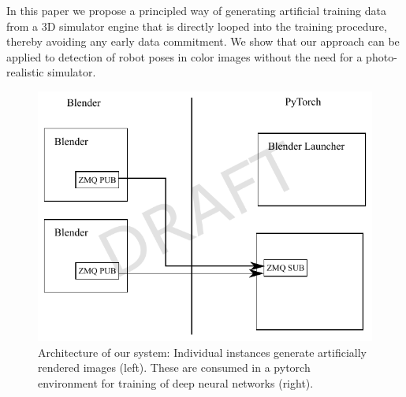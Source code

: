 \documentclass[conference]{IEEEtran}
\begin{document}
In this paper we propose a principled way of generating artificial training data from a 3D simulator engine that is directly looped into the training procedure, thereby avoiding any early data commitment. We show that our approach can be applied to detection of robot poses in color images without the need for a photo-realistic simulator.







\begin{figure}[htbp]
\centerline{\includegraphics[width=\columnwidth]{figures/architecture/architecture.pdf}}
\caption{\label{fig:architecture} Architecture of our system: Individual instances generate artificially rendered images (left). These are consumed in a pytorch environment for training of deep neural networks (right).}
\label{fig}
\end{figure}
\end{document}
